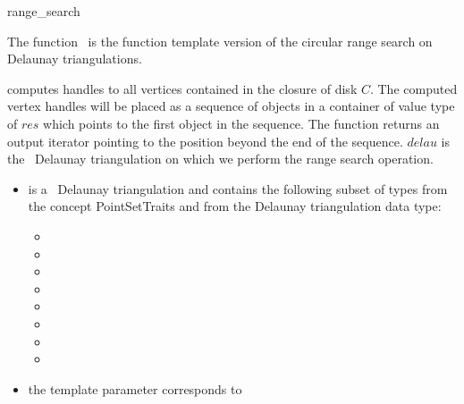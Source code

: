 \begin{ccRefFunction}{range_search}

\ccDefinition  

The function \ccRefName\ is the function template version of the circular range search on Delaunay
triangulations.



{ computes handles to all vertices contained in the closure of disk $C$.
The computed vertex handles will be placed as a sequence of objects in a container of value type
of $res$
which points to the first object in the sequence. The function
returns an output iterator pointing to the position beyond the end
of the sequence.
$delau$ is the \cgal\ Delaunay triangulation on which we perform the range search operation.}

\begin{itemize}
\item {} is a \cgal\ Delaunay triangulation and contains the following subset of types from the concept PointSetTraits and from
the Delaunay triangulation data type:
 \begin{itemize}
  \item {} 
  \item {}
  \item {} 
  \item {}   
  \item {} 
  \item {}  
  \item {} 
  \item {} 
 \end{itemize}
\item the template parameter  corresponds to 
\end{itemize}

\end{ccRefFunction}
